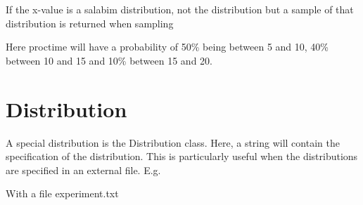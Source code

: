 \documentclass[letterpaper,10pt,english]{sphinxmanual}
\begin{document}
If the x-value is a salabim distribution, not the distribution but a sample of that distribution is returned when sampling

\begin{sphinxVerbatim}[commandchars=\\\{\}]
          
\end{sphinxVerbatim}

Here proctime will have a probability of 50\% being between 5 and 10, 40\% between 10 and 15 and 10\% between 15 and 20.


\section{Distribution}
\label{\detokenize{Distributions:distribution}}
A special distribution is the Distribution class. Here, a string will contain the specification of the distribution.
This is particularly useful when the distributions are specified in an external file. E.g.

\begin{sphinxVerbatim}[commandchars=\\\{\}]
    
      
      
      
\end{sphinxVerbatim}

With a file experiment.txt
\end{document}
